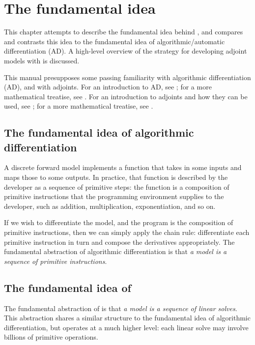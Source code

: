 \chapter{The fundamental idea}

\begin{synopsis}
This chapter attempts to describe the fundamental idea behind \libadjoint, 
and compares and contrasts this idea to the fundamental idea of algorithmic/automatic differentiation (AD).
A high-level overview of the strategy for developing adjoint models with \libadjoint is discussed.
\end{synopsis}
\minitoc
\vspace{\fill}

This manual presupposes some passing familiarity with algorithmic differentiation (AD),
and with adjoints. For an introduction to AD, see \citet{rall1996}; for a more mathematical
treatise, see \citet{griewank2003,griewank2008}. For an introduction to adjoints and how
they can be used, see \citet{gunzburger2003,giles2000,errico1997}; for a more mathematical
treatise, see \citet{hinze2009}.

\newpage

\section{The fundamental idea of algorithmic differentiation}
A discrete forward model implements a function that takes in some inputs
and maps those to some outputs. In practice, that function is described
by the developer as a sequence of primitive steps: the function is
a composition of primitive instructions that the programming environment
supplies to the developer, such as addition, multiplication, exponentiation,
and so on.

If we wish to differentiate the model, and the program is the composition
of primitive instructions, then we can simply apply the chain rule:
differentiate each primitive instruction in turn and compose the derivatives
appropriately. The fundamental abstraction of algorithmic differentiation
is that \emph{a model is a sequence of primitive instructions}.

\section{The fundamental idea of \libadjoint}
The fundamental abstraction of \libadjoint is that \emph{a model is a sequence
of linear solves}. This abstraction shares a similar structure to the fundamental
idea of algorithmic differentiation, but operates at a much higher level:
each linear solve may involve billions of primitive operations.

